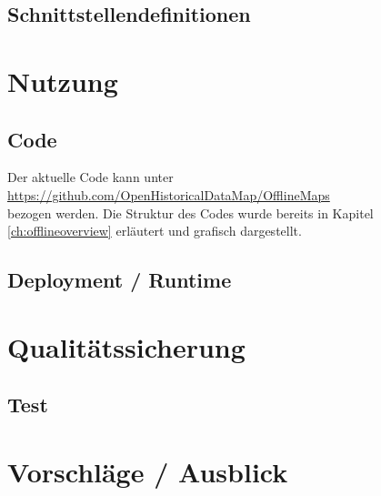 \newpage


\subsection{Schnittstellendefinitionen}\label{ch:offlineinterfaces}


\section{Nutzung}
\subsection{Code}
Der aktuelle Code kann unter\\ \url{https://github.com/OpenHistoricalDataMap/OfflineMaps}\\ bezogen werden. Die Struktur des Codes wurde bereits in Kapitel \ref{ch:offlineoverview} erläutert und grafisch dargestellt.

\subsection{Deployment / Runtime}



\section{Qualitätssicherung}



\subsection{Test}


\section{Vorschläge / Ausblick}
